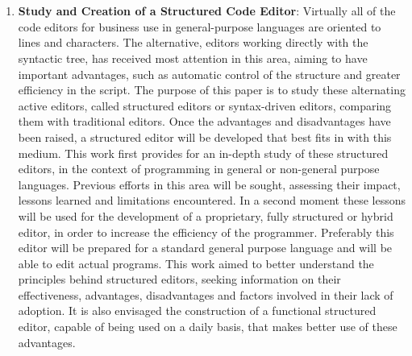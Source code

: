 

%


\chapter{}


\begin{englishtext}
\begin{enumerate}

    \item \textbf{Study and Creation of a Structured Code Editor}: Virtually all
    of the code editors for business use in general\hyp{}purpose languages are
    oriented to lines and characters. The alternative, editors working directly
    with the syntactic tree, has received most attention in this area, aiming to
    have important advantages, such as automatic control of the structure and
    greater efficiency in the script. The purpose of this paper is to study
    these alternating active editors, called structured editors or syntax-driven
    editors, comparing them with traditional editors. Once the advantages and
    disadvantages have been raised, a structured editor will be developed that
    best fits in with this medium. This work first provides for an in-depth
    study of these structured editors, in the context of programming in general
    or non-general purpose languages. Previous efforts in this area will be
    sought, assessing their impact, lessons learned and limitations encountered.
    In a second moment these lessons will be used for the development of a
    proprietary, fully structured or hybrid editor, in order to increase the
    efficiency of the programmer. Preferably this editor will be prepared for a
    standard general purpose language and will be able to edit actual programs.
    This work aimed to better understand the principles behind structured
    editors, seeking information on their effectiveness, advantages,
    disadvantages and factors involved in their lack of adoption. It is also
    envisaged the construction of a functional structured editor, capable of
    being used on a daily basis, that makes better use of these advantages.
    \cite{structuredEditorStudy}


\end{enumerate}
\end{englishtext}
